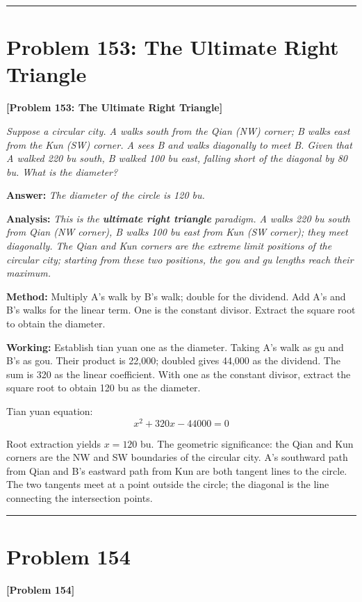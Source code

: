 \documentclass[11pt,a4paper]{book}
\newcommand{\answer}[1]{\noindent\textbf{\color{anacolor}Answer: }\textit{#1}\par}
\newcommand{\method}[1]{\noindent\textbf{\color{methodcolor}Method: }#1\par}
\newcommand{\working}[1]{\noindent\textbf{\color{workcolor}Working: }#1\par}
\newcommand{\analysis}[1]{\noindent\textbf{\color{anacolor}Analysis: }\textit{#1}\par}
\newcommand{\shortline}{\noindent\rule{0.5\textwidth}{0.4pt}\par}
\begin{document}
\shortline

\section{Problem 153: The Ultimate Right Triangle}
\label{sec:prob153}

\noindent\textbf{\color{probcolor}[Problem 153: The Ultimate Right Triangle]}

\textit{Suppose a circular city. A walks south from the Qian (NW) corner; B walks east from the Kun (SW) corner. A sees B and walks diagonally to meet B. Given that A walked 220 bu south, B walked 100 bu east, falling short of the diagonal by 80 bu. What is the diameter?}

\answer{The diameter of the circle is 120 bu.}

\analysis{This is the \textbf{ultimate right triangle} paradigm. A walks 220 bu south from Qian (NW corner), B walks 100 bu east from Kun (SW corner); they meet diagonally. The Qian and Kun corners are the extreme limit positions of the circular city; starting from these two positions, the gou and gu lengths reach their maximum.}

\method{Multiply A's walk by B's walk; double for the dividend. Add A's and B's walks for the linear term. One is the constant divisor. Extract the square root to obtain the diameter.}

\working{Establish tian yuan one as the diameter. Taking A's walk as gu and B's as gou. Their product is 22,000; doubled gives 44,000 as the dividend. The sum is 320 as the linear coefficient. With one as the constant divisor, extract the square root to obtain 120 bu as the diameter.

Tian yuan equation:
$$x^2 + 320x - 44000 = 0$$

Root extraction yields $x = 120$ bu. The geometric significance: the Qian and Kun corners are the NW and SW boundaries of the circular city. A's southward path from Qian and B's eastward path from Kun are both tangent lines to the circle. The two tangents meet at a point outside the circle; the diagonal is the line connecting the intersection points.}

\shortline

\section{Problem 154}
\label{sec:prob154}

\noindent\textbf{\color{probcolor}[Problem 154]}
\end{document}
